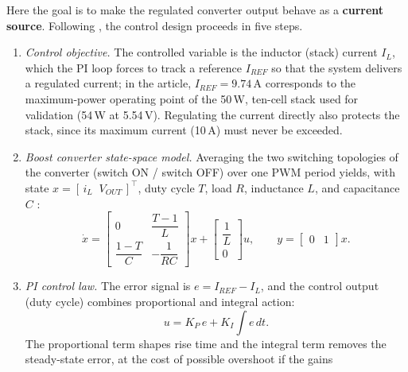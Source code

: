 \documentclass[11pt,a4paper]{article}
\begin{document}
Here the goal is to make the regulated converter output behave as a
\textbf{current source}. Following \cite{derbeli2017}, the control design
proceeds in five steps.

\begin{enumerate}[itemsep=2pt]
    \item \emph{Control objective.} The controlled variable is the inductor
          (stack) current $I_L$, which the PI loop forces to track a reference
          $I_{REF}$ so that the system delivers a regulated current; in the
          article, $I_{REF}=9.74$\,A corresponds to the maximum-power operating
          point of the 50\,W, ten-cell stack used for validation (54\,W at
          5.54\,V). Regulating the current directly also protects the stack,
          since its maximum current (10\,A) must never be exceeded.
    \item \emph{Boost converter state-space model.} Averaging the two switching
          topologies of the converter (switch ON / switch OFF) over one PWM
          period yields, with state $x=[\,i_L \;\; V_{OUT}\,]^{\top}$, duty
          cycle $T$, load $R$, inductance $L$, and capacitance $C$
          \cite{derbeli2017}:
          \begin{equation}
              \dot{x} =
              \begin{bmatrix}
                  0 & \dfrac{T-1}{L} \\[8pt]
                  \dfrac{1-T}{C} & -\dfrac{1}{RC}
              \end{bmatrix} x
              +
              \begin{bmatrix}
                  \dfrac{1}{L} \\[6pt] 0
              \end{bmatrix} u,
              \qquad
              y = \begin{bmatrix} 0 & 1 \end{bmatrix} x.
              \label{eq:boost-ss}
          \end{equation}
    \item \emph{PI control law.} The error signal is $e = I_{REF} - I_L$, and
          the control output (duty cycle) combines proportional and integral
          action:
          \begin{equation}
              u = K_P\, e + K_I \!\int\! e \, dt.
              \label{eq:pi-law}
          \end{equation}
          The proportional term shapes rise time and the integral term removes
          the steady-state error, at the cost of possible overshoot if the gains

\end{enumerate}
\end{document}
